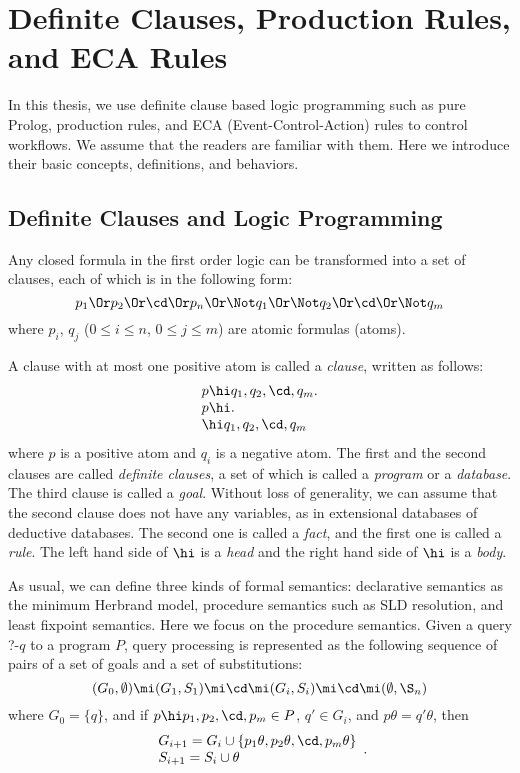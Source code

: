 
%

\begin{sloppypar}
 \section{Definite Clauses, Production Rules, and ECA Rules}
\end{sloppypar}

In this thesis, we use definite clause based logic programming such as
pure Prolog, production rules, and ECA (Event-Control-Action) rules to
control workflows.  We assume that the readers are familiar with them.
Here we introduce their basic concepts, definitions, and behaviors.

\subsection{Definite Clauses and Logic Programming}

Any closed formula in the first order logic can be transformed into a
set of clauses, each of which is in the following form:
\[p_1\Or p_2\Or\cd\Or p_n\Or \Not q_1\Or \Not q_2\Or\cd \Or\Not q_m\]
where $p_i$, $q_j$ ($0\le i\le n$, $0\le j\le m$) are atomic formulas (atoms).

A clause with at most one positive atom is called a {\em clause},
written as follows:
\[\begin{array}{l}
p\hi q_1,q_2,\cd,q_m.\\
p\hi.\\
\hi q_1,q_2,\cd,q_m
\end{array}\]
where $p$ is a positive atom and $q_i$ is a negative atom.  The
first and the second clauses are called {\em definite clauses}, a
set of which is called a {\em program} or a {\em database}.  The third
clause is called a {\em goal}.  Without loss of generality, we can
assume that the second clause does not have any variables, as in
extensional databases of deductive databases.  The second one is
called a {\em fact}, and the first one is called a {\em rule}.  The
left hand side of $\hi$ is a {\em head} and the right hand side of
$\hi$ is a {\em body}.

As usual, we can define three kinds of formal semantics: declarative
semantics as the minimum Herbrand model, procedure semantics such as
SLD resolution, and least fixpoint semantics.  Here we focus on the
procedure semantics.  Given a query ?-$q$ to a program $P$, query
processing is represented as the following sequence of pairs of a set
of goals and a set of substitutions:
\[(G_0,\emptyset)\mi(G_1,S_1)\mi\cd\mi(G_i,S_i)\mi\cd\mi(\emptyset,\S_n)\]
where $G_0=\{q\}$, and if 
$p\hi p_1,p_2,\cd,p_m\in P$, $q'\in G_i$, and $p\theta=q'\theta$, then
\[\begin{array}{l}
G_{i+1}=G_i\cup\{p_1\theta,p_2\theta,\cd,p_m\theta\}\\
S_{i+1}=S_i\cup\theta
\end{array}.\]

